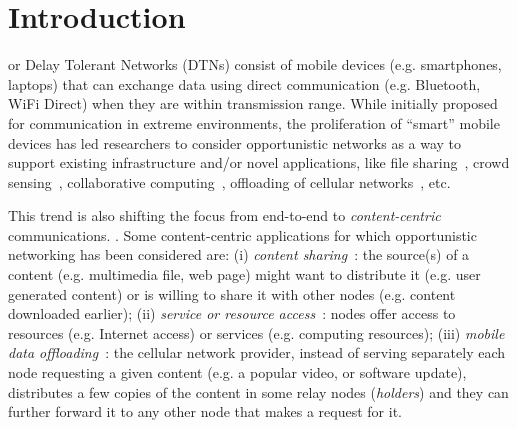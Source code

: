 \documentclass[journal]{IEEEtran}
\begin{document}
\section{Introduction}

 or Delay Tolerant Networks (DTNs) consist of mobile devices (e.g. smartphones, laptops) that can exchange data using direct communication (e.g. Bluetooth, WiFi Direct) when they are within transmission range.  While initially proposed for communication in extreme environments, the proliferation of ``smart'' mobile devices has led researchers to consider opportunistic networks as a way to support existing infrastructure and/or novel applications, like file sharing~\cite{Gao-user-centric-DTN, Yoneki-publish-subscribe-dtn}, crowd sensing~\cite{MobComp-next-decade,Ott-oppnet-applications}, collaborative computing~\cite{opp-computing,Scampi-OppComp}, offloading of cellular networks~\cite{offloading-wowmom11,Hui-Offloading, multiple-offloading}, etc.

This trend is also shifting the focus from end-to-end to \textit{content-centric} communications. . Some content-centric applications for which opportunistic networking has been considered are: (i) \textit{content sharing}~\cite{Gao-user-centric-DTN,contentplace,CEDO}: the source(s) of a content (e.g. multimedia file, web page) might want to distribute it (e.g. user generated content) or is willing to share it with other nodes (e.g. content downloaded earlier); (ii) \textit{service or resource access}~\cite{opp-computing,Scampi-OppComp}: nodes offer access to resources (e.g. Internet access) or services (e.g. computing resources); (iii) \textit{mobile data offloading}~\cite{offloading-wowmom11,Hui-Offloading,multiple-offloading}: the cellular network provider, instead of serving separately each node requesting a given content (e.g. a popular video, or software update), distributes a few copies of the content in some relay nodes (\textit{holders}) and they can further forward it to any other node that makes a request for it. 
\end{document}
